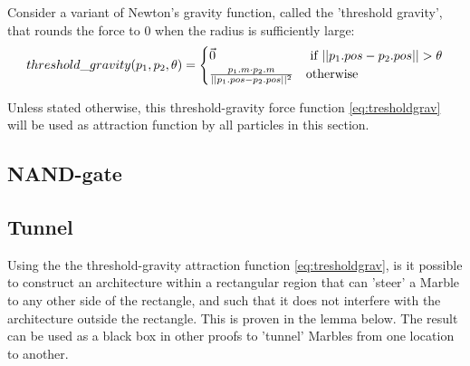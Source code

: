 Consider a variant of Newton's gravity function, called the 'threshold gravity', that rounds the force to 0 when the radius is sufficiently large:
\begin{equation}
    threshold\_gravity(p_1, p_2, \theta) = \begin{cases}
        \vec{0} & \text{ if } \lvert\lvert p_1.pos - p_2.pos \rvert\rvert > \theta \\
        \frac{p_1.m \cdot p_2.m}{\lvert\lvert p_1.pos - p_2.pos \rvert\rvert^2} & \text{otherwise}
        \end{cases} \label{eq:tresholdgrav}
\end{equation}

Unless stated otherwise, this threshold-gravity force function \eqref{eq:tresholdgrav} will be used as attraction function by all particles in this section.

\subsection{NAND-gate}


\subsection{Tunnel}

Using the the threshold-gravity attraction function \eqref{eq:tresholdgrav}, is it possible to construct an architecture within a rectangular region that can 'steer' a Marble to any other side of the rectangle, and such that it does not interfere with the architecture outside the rectangle. This is proven in the lemma below. The result can be used as a black box in other proofs to 'tunnel' Marbles from one location to another.

